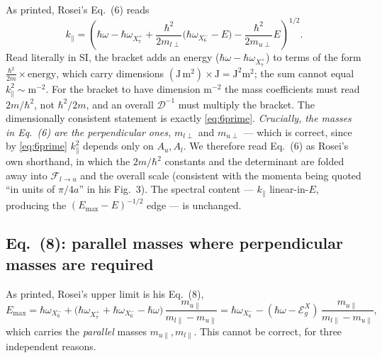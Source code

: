 \documentclass[11pt]{article}
\newcommand{\kpar}{k_{\parallel}}
\newcommand{\hw}{\hbar\omega}
\newcommand{\EgX}{\mathcal{E}_{g}^{X}}
\newcommand{\Dc}{\mathcal{D}}
\newcommand{\Flu}{\mathcal{F}_{l\to u}}
\newcommand{\wXsix}{\hbar\omega_{X_6^-}}
\newcommand{\wXseven}{\hbar\omega_{X_7^+}}
\newcommand{\Rq}[1]{\textcolor{roseicol}{\textnormal{(#1)}}}
\begin{document}
As printed, Rosei's Eq.~\Rq{6} reads
%
\begin{equation}
\kpar=\left(\hw-\wXseven+\frac{\hbar^2}{2m_{l\perp}}\bigl(\wXsix-E\bigr)
            -\frac{\hbar^2}{2m_{u\perp}}E\right)^{1/2}.
\tag{6, as printed}
\end{equation}
%
Read literally in SI, the bracket adds an energy ($\hw-\wXseven$) to terms of the form
$\tfrac{\hbar^2}{2m}\times\text{energy}$, which carry dimensions
$(\text{J}\,\text{m}^2)\times\text{J}=\text{J}^2\text{m}^2$; the sum cannot equal
$\kpar^2\sim\text{m}^{-2}$. For the bracket to have dimension $\text{m}^{-2}$ the mass
coefficients must read $2m/\hbar^2$, not $\hbar^2/2m$, and an overall $\Dc^{-1}$ must
multiply the bracket. The dimensionally consistent statement is exactly
\eqref{eq:6prime}. \emph{Crucially, the masses in Eq.~\Rq{6} are the perpendicular ones,}
$m_{l\perp}$ and $m_{u\perp}$ --- which is correct, since by \eqref{eq:6prime}
$\kpar^2$ depends only on $A_u,A_l$. We therefore read Eq.~\Rq{6} as Rosei's own
shorthand, in which the $2m/\hbar^2$ constants and the determinant are folded away into
$\Flu$ and the overall scale (consistent with the momenta being quoted ``in units of
$\pi/4a$'' in his Fig.~3). The spectral content --- $\kpar$ linear-in-$E$, producing the
$(E_{\max}-E)^{-1/2}$ edge --- is unchanged.

\subsection{Eq.~\Rq{8}: parallel masses where perpendicular masses are required}

As printed, Rosei's upper limit is his Eq.~\Rq{8},
%
\begin{equation}
E_{\max}=\wXsix+\bigl(\wXseven+\wXsix-\hw\bigr)\,
         \frac{m_{u\|}}{m_{l\|}-m_{u\|}}
       =\wXsix-(\hw-\EgX)\,\frac{m_{u\|}}{m_{l\|}-m_{u\|}},
\tag{8, as printed}
\end{equation}
%
which carries the \emph{parallel} masses $m_{u\|},m_{l\|}$. This cannot be correct, for
three independent reasons.
\end{document}
